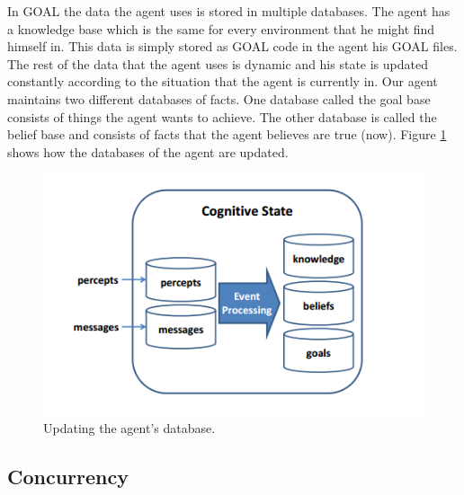 In GOAL the data the agent uses is stored in multiple databases. The agent has a knowledge base which is the same for every environment that he might find himself in. This data is simply stored as GOAL code in the agent his GOAL files. The rest of the data that the agent uses is dynamic and his state is updated constantly according to the situation that the agent is currently in. Our agent maintains two different databases of facts. One database called the goal base consists of things the agent wants to achieve. The other database is called the belief base and consists of facts that the agent believes are true (now).  Figure \ref{fig:agentstate1} shows how the databases of the agent are updated.

\begin{figure}[h!]
  \includegraphics[width=\linewidth]{agentstate.png}
  \caption{Updating the agent's database.}
  \label{fig:agentstate1}
\end{figure}

\newpage
\subsection{Concurrency}





